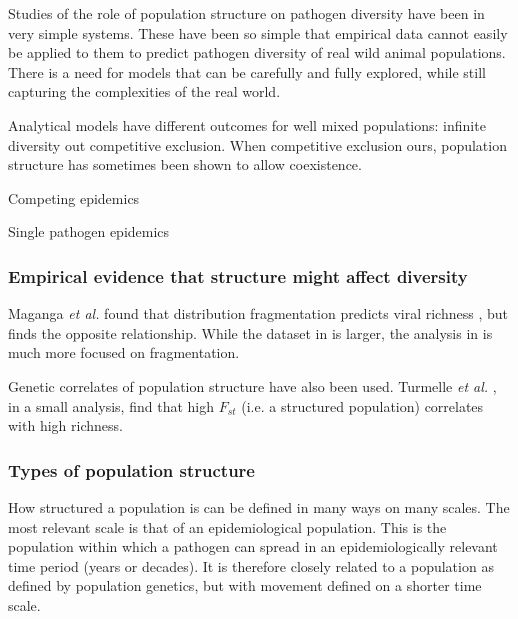 
Studies of the role of population structure on pathogen diversity have been in very simple systems.
These have been so simple that empirical data cannot easily be applied to them to predict pathogen diversity of real wild animal populations.
There is a need for models that can be carefully and fully explored, while still capturing the complexities of the real world.

Analytical models have different outcomes for well mixed populations: infinite diversity out competitive exclusion.
When competitive exclusion ours, population structure has sometimes been shown to allow coexistence.



Competing epidemics

\cite{poletto2013host, poletto2015characterising, karrer2011competing}

Single pathogen epidemics






\subsubsection{Empirical evidence that structure might affect diversity}


Maganga \emph{et al.} found that distribution fragmentation predicts viral richness \cite{maganga2014bat}, but \cite{gay2014parasite} finds the opposite relationship. 
While the dataset in \cite{gay2014parasite} is larger, the analysis in \cite{maganga2014bat} is much more focused on fragmentation.

Genetic correlates of population structure have also been used.
Turmelle \emph{et al.} \cite{turmelle2009correlates}, in a small analysis, find that high $F_{st}$ (i.e. a structured population) correlates with high richness.



\subsubsection{Types of population structure}

How structured a population is can be defined in many ways on many scales.
The most relevant scale is that of an epidemiological population.
This is the population within which a pathogen can spread in an epidemiologically relevant time period (years or decades).
It is therefore closely related to a population as defined by population genetics, but with movement defined on a shorter time scale.

